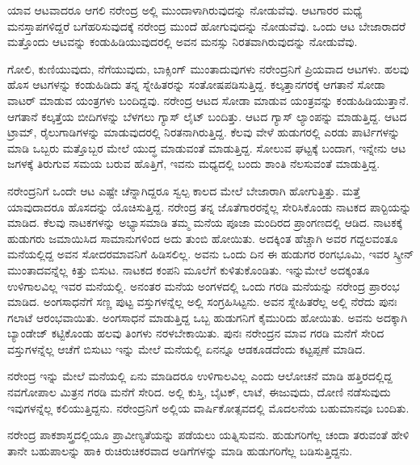 ಯಾವ ಆಟವಾದರೂ ಆಗಲಿ ನರೇಂದ್ರ ಅಲ್ಲಿ ಮುಂದಾಳಾಗಿರುವುದನ್ನು ನೋಡುವೆವು. ಆಟಗಾರರ ಮಧ್ಯೆ ಮನಸ್ತಾಪಗಳಿದ್ದರೆ ಬಗೆಹರಿಸುವುದಕ್ಕೆ ನರೇಂದ್ರ ಮುಂದೆ ಹೋಗುವುದನ್ನು ನೋಡುವೆವು. ಒಂದು ಆಟ ಬೇಜಾರಾದರೆ ಮತ್ತೊಂದು ಆಟವನ್ನು ಕಂಡುಹಿಡಿಯುವುದರಲ್ಲಿ ಅವನ ಮನಸ್ಸು ನಿರತವಾಗಿರುವುದನ್ನು ನೋಡುವೆವು.

ಗೋಲಿ, ಕುಣಿಯುವುದು, ನೆಗೆಯುವುದು, ಬಾಕ್ಸಿಂಗ್ ಮುಂತಾದುವುಗಳು ನರೇಂದ್ರನಿಗೆ ಪ್ರಿಯವಾದ ಆಟಗಳು. ಹಲವು ಹೊಸ ಆಟಗಳನ್ನು ಕಂಡುಹಿಡಿದು ತನ್ನ ಸ್ನೇಹಿತರನ್ನು ಸಂತೋಷಪಡಿಸುತ್ತಿದ್ದ. ಕಲ್ಕತ್ತಾನಗರಕ್ಕೆ ಆಗತಾನೆ ಸೋಡಾ ವಾಟರ್ ಮಾಡುವ ಯಂತ್ರಗಳು ಬಂದಿದ್ದವು. ನರೇಂದ್ರ ಆಟದ ಸೋಡಾ ಮಾಡುವ ಯಂತ್ರವನ್ನು ಕಂಡುಹಿಡಿಯುತ್ತಾನೆ. ಆಗತಾನೆ ಕಲ್ಕತ್ತೆಯ ಬೀದಿಗಳನ್ನು ಬೆಳಗಲು ಗ್ಯಾಸ್ ಲೈಟ್ ಬಂದಿತ್ತು. ಆಟದ ಗ್ಯಾಸ್ ಲ್ಯಾಂಪನ್ನು ಮಾಡುತ್ತಿದ್ದ. ಆಟದ ಟ್ರಾಮ್, ರೈಲುಗಾಡಿಗಳನ್ನು ಮಾಡುವುದರಲ್ಲಿ ನಿರತನಾಗಿರುತ್ತಿದ್ದ. ಕೆಲವು ವೇಳೆ ಹುಡುಗರಲ್ಲಿ ಎರಡು ಪಾರ್ಟಿಗಳನ್ನು ಮಾಡಿ ಒಬ್ಬರು ಮತ್ತೊಬ್ಬರ ಮೇಲೆ ಯುದ್ಧ ಮಾಡುವಂತೆ ಮಾಡುತ್ತಿದ್ದ. ಸೋಲುವ ಘಟ್ಟಕ್ಕೆ ಬಂದಾಗ, ಇನ್ನೇನು ಆಟ ಜಗಳಕ್ಕೆ ತಿರುಗುವ ಸಮಯ ಬರುವ ಹೊತ್ತಿಗೆ, ಇವನು ಮಧ್ಯದಲ್ಲಿ ಬಂದು ಶಾಂತಿ ನೆಲಸುವಂತೆ ಮಾಡುತ್ತಿದ್ದ.

ನರೇಂದ್ರನಿಗೆ ಒಂದೇ ಆಟ ಎಷ್ಟೇ ಚೆನ್ನಾಗಿದ್ದರೂ ಸ್ವಲ್ಪ ಕಾಲದ ಮೇಲೆ ಬೇಜಾರಾಗಿ ಹೋಗುತ್ತಿತ್ತು. ಮತ್ತೆ ಯಾವುದಾದರೂ ಹೊಸದನ್ನು ಯೊಚಿಸುತ್ತಿದ್ದ. ನರೇಂದ್ರ ತನ್ನ ಜೊತೆಗಾರರನ್ನೆಲ್ಲ ಸೇರಿಸಿಕೊಂಡು ನಾಟಕದ ಪಾರ‍್ಟಿಯನ್ನು ಮಾಡಿದ. ಕೆಲವು ನಾಟಕಗಳನ್ನು ಅಭ್ಯಾಸಮಾಡಿ ತಮ್ಮ ಮನೆಯ ಪೂಜಾ ಮಂದಿರದ ಪ್ರಾಂಗಣದಲ್ಲಿ ಆಡಿದ. ನಾಟಕಕ್ಕೆ ಹುಡುಗರು ಜಮಾಯಿಸಿದ ಸಾಮಾನುಗಳಿಂದ ಅದು ತುಂಬಿ ಹೋಯಿತು. ಅದಕ್ಕಿಂತ ಹೆಚ್ಚಾಗಿ ಅವರ ಗದ್ದಲವಂತೂ ಮನೆಯಲ್ಲಿದ್ದ ಅವನ ಸೋದರಮಾವನಿಗೆ ಹಿಡಿಸಲಿಲ್ಲ. ಅವನು ಒಂದು ದಿನ ಈ ಹುಡುಗರ ರಂಗಭೂಮಿ, ಇವರ ಸ್ಕ್ರೀನ್ ಮುಂತಾದವನ್ನೆಲ್ಲ ಕಿತ್ತು ಬಿಸುಟ. ನಾಟಕದ ಕಂಪನಿ ಮೂಲೆಗೆ ಕುಳಿತುಕೊಂಡಿತು. ಇನ್ನುಮೇಲೆ ಅದಕ್ಕಂತೂ ಉಳಿಗಾಲವಿಲ್ಲ ಇವರ ಮನೆಯಲ್ಲಿ. ಅನಂತರ ಮನೆಯ ಅಂಗಳದಲ್ಲಿ ಒಂದು ಗರಡಿ ಮನೆಯನ್ನು ನರೇಂದ್ರ ಪ್ರಾರಂಭ ಮಾಡಿದ. ಅಂಗಸಾಧನೆಗೆ ಸಣ್ಣ ಪುಟ್ಟ ವಸ್ತುಗಳನ್ನೆಲ್ಲ ಅಲ್ಲಿ ಸಂಗ್ರಹಿಸಿಟ್ಟನು. ಅವನ ಸ್ನೇಹಿತರೆಲ್ಲ ಅಲ್ಲಿ ನೆರೆದು ಪುನಃ ಗಲಾಟೆ ಆರಂಭವಾಯಿತು. ಅಂಗಸಾಧನೆ ಮಾಡುತ್ತಿದ್ದ ಒಬ್ಬ ಹುಡುಗನಿಗೆ ಕೈಮುರಿದು ಹೋಯಿತು. ಅವನು ಅದಕ್ಕಾಗಿ ಬ್ಯಾಂಡೇಜ್ ಕಟ್ಟಿಕೊಂಡು ಹಲವು ತಿಂಗಳು ನರಳಬೇಕಾಯಿತು. ಪುನಃ ನರೇಂದ್ರನ ಮಾವ ಗರಡಿ ಮನೆಗೆ ಸೇರಿದ ವಸ್ತುಗಳನ್ನೆಲ್ಲ ಆಚೆಗೆ ಬಿಸುಟು ಇನ್ನು ಮೇಲೆ ಮನೆಯಲ್ಲಿ ಏನನ್ನೂ ಆಡಕೂಡದೆಂದು ಕಟ್ಟಪ್ಪಣೆ ಮಾಡಿದ.

ನರೇಂದ್ರ ಇನ್ನು ಮೇಲೆ ಮನೆಯಲ್ಲಿ ಏನು ಮಾಡಿದರೂ ಉಳಿಗಾಲವಿಲ್ಲ ಎಂದು ಆಲೋಚನೆ ಮಾಡಿ ಹತ್ತಿರದಲ್ಲಿದ್ದ ನವಗೋಪಾಲ ಮಿತ್ರನ ಗರಡಿ ಮನೆಗೆ ಸೇರಿದ. ಅಲ್ಲಿ ಕುಸ್ತಿ, ಬೈಟಕ್, ಲಾಟೆ, ಈಜುವುದು, ದೋಣಿ ನಡೆಸುವುದು ಇವುಗಳನ್ನೆಲ್ಲ ಕಲಿಯುತ್ತಿದ್ದನು. ನರೇಂದ್ರನಿಗೆ ಅಲ್ಲಿಯ ವಾರ್ಷಿಕೋತ್ಸವದಲ್ಲಿ ಮೊದಲನೆಯ ಬಹುಮಾನವೂ ಬಂದಿತು.

ನರೇಂದ್ರ ಪಾಕಶಾಸ್ತ್ರದಲ್ಲಿಯೂ ಪ್ರಾವೀಣ್ಯತೆಯನ್ನು ಪಡೆಯಲು ಯತ್ನಿಸುವನು. ಹುಡುಗರಿಗೆಲ್ಲ ಚಂದಾ ತರುವಂತೆ ಹೇಳಿ ತಾನೇ ಬಹುಪಾಲನ್ನು ಹಾಕಿ ರುಚಿರುಚಿಕರವಾದ ಅಡಿಗೆಗಳನ್ನು ಮಾಡಿ ಹುಡುಗರಿಗೆಲ್ಲ ಬಡಿಸುತ್ತಿದ್ದನು.


